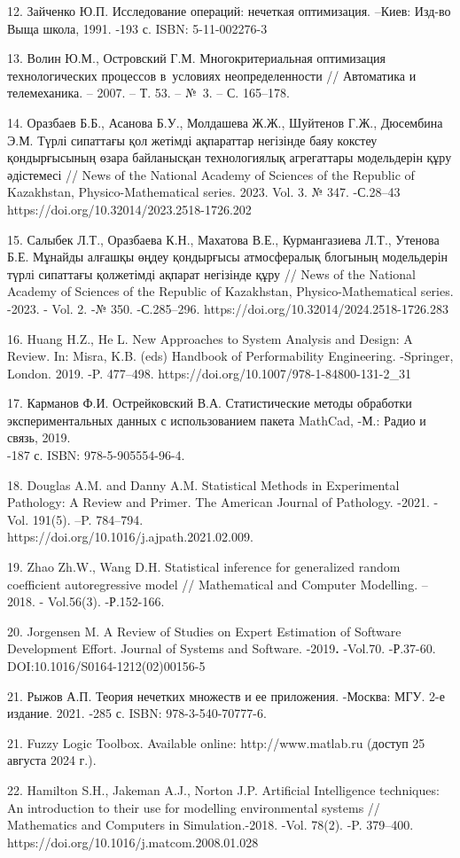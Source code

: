 \begin{noparindent}
12. Зайченко Ю.П. Исследование операций: нечеткая оптимизация. --Киев:
Изд-во Выща школа, 1991. -193 с. ISBN: 5-11-002276-3

13. Волин Ю.М., Островский Г.М. Многокритериальная оптимизация
технологических процессов в~условиях неопределенности // Автоматика и
телемеханика. -- 2007. -- Т. 53. -- №~3. -- С. 165--178.

14. Оразбаев Б.Б., Асанова Б.У., Молдашева Ж.Ж., Шуйтенов Г.Ж.,
Дюсембина Э.М. Түрлі сипаттағы қол жетімді ақпараттар негізінде баяу
кокстеу қондырғысының өзара байланысқан технологиялық агрегаттары
модельдерін құру әдістемесі // News of the National Academy of Sciences
of the Republic of Kazakhstan, Physico-Mathematical series. 2023. Vol.
3. № 347. -С.28--43\\ https://doi.org/10.32014/2023.2518-1726.202

15. Салыбек Л.Т., Оразбаева К.Н., Махатова В.Е., Курмангазиева Л.Т.,
Утенова Б.Е. Мұнайды алғашқы өңдеу қондырғысы атмосфералық блогының
модельдерін түрлі сипаттағы қолжетімді ақпарат негізінде құру // News of
the National Academy of Sciences of the Republic of Kazakhstan,
Physico-Mathematical series. -2023. - Vol. 2. -№ 350. -С.285--296.
https://doi.org/10.32014/2024.2518-1726.283

16. Huang H.Z., He L. New Approaches to System Analysis and Design: A
Review. In: Misra, K.B. (eds) Handbook of Performability Engineering.
-Springer, London. 2019. -P. 477--498.
https://doi.org/10.1007/978-1-84800-131-2\_31

17. Карманов Ф.И. Острейковский В.А. Статистические методы обработки
экспериментальных данных с использованием пакета MathCad, -М.: Радио и
связь, 2019.\\
-187 с. ISBN: 978-5-905554-96-4.

18. Douglas A.M. and Danny A.M. Statistical Methods in Experimental
Pathology: A Review and Primer. The American Journal of Pathology.
-2021. -Vol. 191(5). --P. 784--794. \\
https://doi.org/10.1016/j.ajpath.2021.02.009.

19. Zhao Zh.W., Wang D.H. Statistical inference for generalized random
coefficient autoregressive model // Mathematical and Computer Modelling.
-- 2018. - Vol.56(3). -Р.152-166.

20. Jorgensen M. A Review of Studies on Expert Estimation of Software
Development Effort. Journal of Systems and Software. -2019{\bfseries .}
-Vol.70. -Р.37-60. DOI:10.1016/S0164-1212(02)00156-5

21. Рыжов А.П. Теория нечетких множеств и ее приложения. -Москва: МГУ.
2-е издание. 2021. -285 с. ISBN: 978-3-540-70777-6.

21. Fuzzy Logic Toolbox. Available online: http://www.matlab.ru (доступ
25 августа 2024 г.).

22. Hamilton S.H., Jakeman A.J., Norton J.P. Artificial Intelligence
techniques: An introduction to their use for modelling environmental
systems // Mathematics and Computers in Simulation.-2018. -Vol. 78(2).
-P. 379--400. https://doi.org/10.1016/j.matcom.2008.01.028

\end{noparindent}

